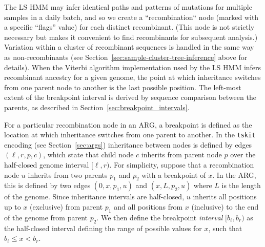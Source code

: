 \documentclass{article}
\begin{document}
The LS HMM may infer identical paths and patterns of mutations
for multiple samples in a daily batch, and so we
create a ``recombination`` node (marked with a specific ``flags'' value)
for each distinct recombinant. (This node is not strictly necessary
but makes it convenient to find recombinants for subsequent analysis.)
Variation within a cluster
of recombinant sequences is handled in the same way as non-recombinants
(see Section~\ref{sec:sample-cluster-tree-inference} above for details).
When the Viterbi algorithm implementation used by the LS HMM infers
recombinant ancestry for a given genome, the point at which inheritance
switches from one parent node to another is the last possible
position. The left-most extent of the breakpoint interval is derived
by sequence comparison between the parents, as described in
Section~\ref{sec:breakpoint_intervals}.

For a particular recombination node in an ARG, a  breakpoint
is defined as the location at which inheritance switches from one parent
to another.
In the \texttt{tskit} encoding (see Section~\ref{sec:args}) inheritance between
nodes is defined by edges $(\ell, r, p, c)$, which state that child node $c$
inherits from parent node $p$
over the half-closed genome interval $[\ell, r)$.
For simplicity, suppose that a recombination node $u$ inherits from two
parents $p_1$ and $p_2$ with a breakpoint of $x$.
In the ARG, this is defined by two edges
$(0, x, p_1, u)$ and $(x, L, p_2, u)$ where $L$ is the length of the genome.
Since inheritance intervals are half-closed,
$u$ inherits all positions up to $x$ (exclusive) from parent $p_1$
and all positions from $x$ (inclusive) to the end of the genome from parent
$p_2$. We then define the breakpoint \emph{interval} $[b_\ell, b_r)$ as the
half-closed interval defining the range of possible values for $x$, such
that $b_\ell \leq x < b_r$.

\end{document}
